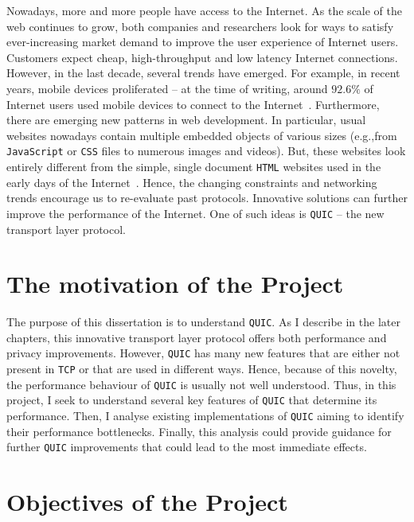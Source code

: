 \documentclass[12pt,a4paper]{report}
\begin{document}
Nowadays, more and more people have access to the Internet.
As the scale of the web continues to grow, both companies and researchers look for ways to satisfy ever-increasing market demand to improve the user experience of Internet users.
Customers expect cheap, high-throughput and low latency Internet connections.
However, in the last decade, several trends have emerged.
For example, in recent years, mobile devices proliferated -- at the time of writing, around $92.6\%$ of Internet users used mobile devices to connect to the Internet~\cite{bib_number_of_mobile_users}.
Furthermore, there are emerging new patterns in web development.
In particular, usual websites nowadays contain multiple embedded objects of various sizes (e.g.,from \texttt{JavaScript} or \texttt{CSS} files to numerous images and videos)\cite{bib_Netdev_0x13_QUIC_Tutorial}.
But, these websites look entirely different from the simple, single document \texttt{HTML} websites used in the early days of the Internet~\cite{RudmanRiaan2016DW3o}.
Hence, the changing constraints and networking trends encourage us to re-evaluate past protocols.
Innovative solutions can further improve the performance of the Internet. 
One of such ideas is \texttt{QUIC} -- the new transport layer protocol.

\section{The motivation of the Project}

The purpose of this dissertation is to understand \texttt{QUIC}.
As I describe in the later chapters, this innovative transport layer protocol offers both performance and privacy improvements.
However, \texttt{QUIC} has many new features that are either not present in \texttt{TCP} or that are used in different ways.
Hence, because of this novelty, the performance behaviour of \texttt{QUIC} is usually not well understood.
Thus, in this project, I seek to understand several key features of \texttt{QUIC} that determine its performance.
Then, I analyse existing implementations of \texttt{QUIC} aiming to identify their performance bottlenecks.
Finally, this analysis could provide guidance for further \texttt{QUIC} improvements that could lead to the most immediate effects.


\section{Objectives of the Project}
\end{document}
